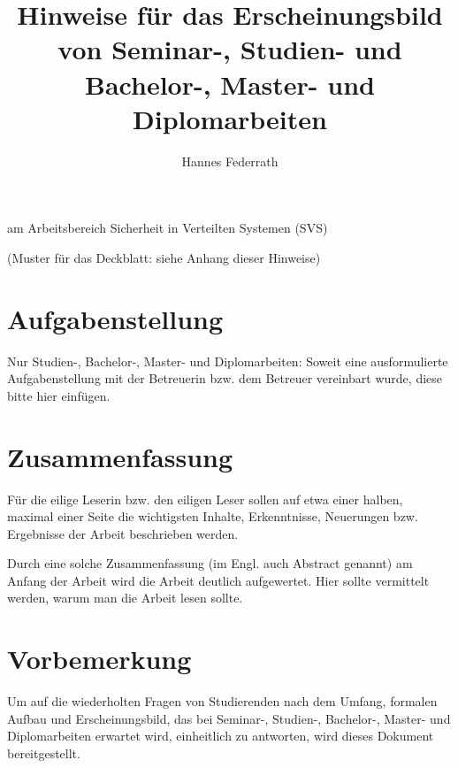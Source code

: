 \documentclass[
    fontsize=12pt,
    headings=small,
    parskip=half,           %
    bibliography=totoc,
    numbers=noenddot,       %
    open=any,               %
    ]{scrreprt}
\title{Hinweise für das Erscheinungsbild von Seminar-, Studien- und Bachelor-,
    Master- und Diplomarbeiten}
\author{Hannes Federrath}
\begin{document}
\begin{titlepage}
\begin{center}\Large
    \vfill
    \makeatletter
    {\Large\textsf{\textbf{\@title}}\par}
    \makeatother
    \bigskip
    am Arbeitsbereich Sicherheit in Verteilten Systemen (SVS) \par
    \bigskip
    \makeatletter
    {\@author} \par
    \makeatother
    \bigskip
    \makeatletter
    {\@date}
    \makeatother
    \vfill
    \vfill
    (Muster für das Deckblatt: siehe Anhang dieser Hinweise)
\end{center}
\end{titlepage}

\chapter*{Aufgabenstellung}

Nur Studien-, Bachelor-, Master- und Diplomarbeiten: Soweit eine ausformulierte Aufgabenstellung mit der Betreuerin bzw. dem Betreuer vereinbart wurde, diese bitte hier einfügen.

\chapter*{Zusammenfassung}

Für die eilige Leserin bzw. den eiligen Leser sollen auf etwa einer halben, maximal einer Seite die wichtigsten Inhalte, Erkenntnisse, Neuerungen bzw. Ergebnisse der Arbeit beschrieben werden.

Durch eine solche Zusammenfassung (im Engl. auch Abstract genannt) am Anfang der Arbeit wird die Arbeit deutlich aufgewertet. Hier sollte vermittelt werden, warum man die Arbeit lesen sollte.

\tableofcontents

\chapter{Vorbemerkung}

Um auf die wiederholten Fragen von Studierenden nach dem Umfang, formalen Aufbau und Erscheinungsbild, das bei Seminar-, Studien-, Bachelor-, Master- und Diplomarbeiten erwartet wird, einheitlich zu antworten, wird dieses Dokument bereitgestellt.
\end{document}
